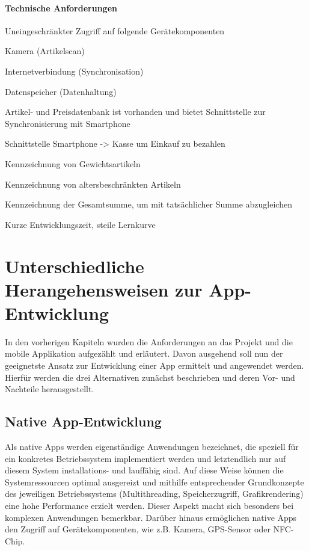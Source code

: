 \paragraph{Technische Anforderungen}
\begin{seList}
	\item Uneingeschränkter Zugriff auf folgende Gerätekomponenten
	\begin{seList}
		\item Kamera (Artikelscan)
		\item Internetverbindung (Synchronisation)
		\item Datenspeicher (Datenhaltung)
	\end{seList}
	\item Artikel- und Preisdatenbank ist vorhanden und bietet Schnittstelle zur Synchronisierung mit Smartphone
	\item Schnittstelle Smartphone -> Kasse um Einkauf zu bezahlen
	\begin{seList}
		\item Kennzeichnung von Gewichtsartikeln
		\item Kennzeichnung von altersbeschränkten Artikeln
		\item Kennzeichnung der Gesamtsumme, um mit tatsächlicher Summe abzugleichen
	\end{seList}
	\item Kurze Entwicklungszeit, steile Lernkurve
\end{seList}

\section{Unterschiedliche Herangehensweisen zur App-Entwicklung}
%
%
In den vorherigen Kapiteln wurden die Anforderungen an das Projekt und die mobile Applikation aufgezählt und erläutert. Davon ausgehend soll nun der geeignetste Ansatz zur Entwicklung einer App ermittelt und angewendet werden. Hierfür werden die drei Alternativen zunächst beschrieben und deren Vor- und Nachteile herausgestellt.

\subsection{Native App-Entwicklung}
Als native Apps werden eigenständige Anwendungen bezeichnet, die speziell für ein konkretes Betriebssystem implementiert werden und letztendlich nur auf diesem System installations- und lauffähig sind. Auf diese Weise können die Systemressourcen optimal ausgereizt und mithilfe entsprechender Grundkonzepte des jeweiligen Betriebssystems (Multithreading, Speicherzugriff, Grafikrendering) eine hohe Performance erzielt werden. Dieser Aspekt macht sich besonders bei komplexen Anwendungen bemerkbar. Darüber hinaus ermöglichen native Apps den Zugriff auf Gerätekomponenten, wie z.B. Kamera, GPS-Sensor oder NFC-Chip.
 
